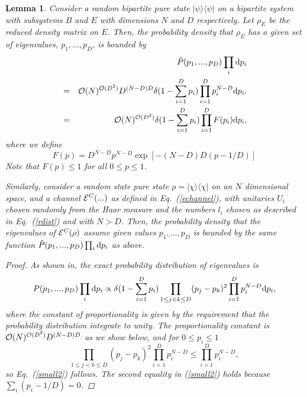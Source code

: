 \documentclass[aps,prl,amsmath,amssymb,amsfonts,superscriptaddress,floatfix]{revtex4}
\newtheorem{lemma}{Lemma}
\newcommand{\conc}{{\cal E}^C}
\newcommand{\be}{\begin{equation}}
\newcommand{\ee}{\end{equation}}
\newcommand{\FF}{F}
\begin{document}
\begin{lemma}
Consider a random bipartite pure state $|\psi\rangle\langle\psi|$
on a bipartite system with subsystems
$B$ and $E$ with dimensions $N$ and $D$ respectively.
Let $\rho_E$ be the reduced density matrix on $E$.  Then,
the probability density
that $\rho_E$ has a given set of eigenvalues, $p_1,...,p_D$,
is bounded by
\begin{eqnarray}
\label{small2}
&&\tilde P(p_1,...,p_D)\prod_i {\rm d}p_i
\\ \nonumber
&=&
{\cal O}(N)^{{\cal O}(D^2)} 
D^{(N-D)D} \delta(1-\sum_{i=1}^D p_i) \prod_{i=1}^D p_i^{N-D} {\rm d}p_i.
\\ \nonumber
&=& {\cal O}(N)^{{\cal O}(D^2)} 
\delta(1-\sum_{i=1}^D p_i) \prod_{i=1}^D \FF(p_i) {\rm d}p_i,
\end{eqnarray}
where we define
\be
\FF(p)=D^{N-D} p^{N-D} \exp[-(N-D)D(p-1/D)] 
\ee
Note that
$\FF(p)\leq 1$
for all $0\leq p \leq 1$.

Similarly, consider a random state pure state $\rho=|\chi\rangle\langle\chi|$ on
an $N$ dimensional space, and a channel $\conc(...)$ as defined in Eq.~(\ref{echannel}), with
unitaries $U_i$ chosen randomly from the Haar measure and the numbers $l_i$ chosen as
described in Eq.~(\ref{rdist}) and with $N>D$.  Then, the probability density that the eigenvalues of
$\conc(\rho)$ assume given values $p_1,...,p_D$ is bounded by
the same function
$\tilde P(p_1,...,p_D)\prod_i {\rm d}p_i$ as above.

\begin{proof}
As shown in\cite{pl,pl2}, the exact probability distribution of eigenvalues
is
\be
P(p_1,...,p_D)\prod_i {\rm d}p_i\propto 
\delta(1-\sum_{i=1}^D p_i) \prod_{1\leq j<k\leq D} (p_j-p_k)^2
\prod_{i=1}^D p_i^{N-D} {\rm d}p_i,
\ee
where the constant of proportionality is given by the requirement that the probability
distribution integrate to unity.  The proportionality constant is ${\cal O}(N)^{{\cal O}(D^2)} D^{(N-D)D}$ as we show below,
and for $0\leq p_i \leq 1$
\be
\prod_{1\leq j<k\leq D} (p_j-p_k)^2
\prod_{i=1}^D p_i^{N-D}\leq
\prod_{i=1}^D p_i^{N-D},
\ee
so Eq.~(\ref{small2}) follows.
The second equality in (\ref{small2}) holds because $\sum_i (p_i-1/D)=0$.


\end{proof}
\end{lemma}
\end{document}

